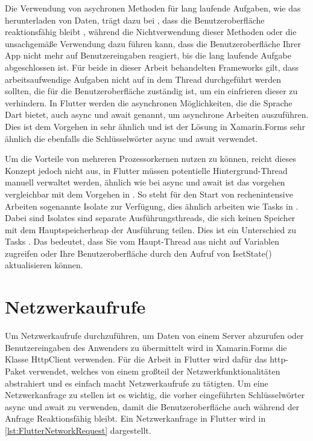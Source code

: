 Die Verwendung von asychronen Methoden für lang laufende Aufgaben, wie das herunterladen von Daten, trägt dazu bei , dass die Benutzeroberfläche reaktionsfähig bleibt , während die Nichtverwendung dieser Methoden oder die unsachgemäße Verwendung dazu führen kann,  dass die Benutzeroberfläche Ihrer App nicht mehr auf Benutzereingaben reagiert, bis die lang laufende Aufgabe abgeschlossen ist.  Für beide in dieser Arbeit behandelten Frameworks gilt,  dass arbeitsaufwendige Aufgaben nicht auf in dem Thread durchgeführt werden sollten,  die für die Benutzeroberfläche zuständig ist, um ein einfrieren dieser zu verhindern. 
In Flutter werden die asynchronen Möglichkeiten, die die Sprache Dart bietet, auch \glq async\grq{} und \glq await\grq{}  genannt, um asynchrone Arbeiten auszuführen. Dies ist dem Vorgehen in \Csharp sehr ähnlich und ist der Lösung in Xamarin.Forms sehr ähnlich die ebenfalls die Schlüsselwörter  \glq async\grq{} und \glq await\grq{}  verwendet. 

Um die Vorteile von mehreren Prozessorkernen nutzen zu können,  reicht dieses Konzept jedoch nicht aus,  in Flutter müssen potentielle Hintergrund-Thread manuell verwaltet werden,  ähnlich wie bei \glq async\grq{} und \glq await\grq{}  ist das vorgehen vergleichbar mit dem Vorgehen in \Csharp. So steht für den Start von rechenintensive Arbeiten sogenannte \glq Isolate\grq{} zur Verfügung,   dies ähnlich arbeiten wie Tasks in \Csharp. Dabei sind \glq Isolates \grq{}  sind separate Ausführungsthreads, die sich keinen Speicher mit dem Hauptspeicherheap der Ausführung teilen.  Dies ist ein Unterschied zu \glq Tasks\grq{} .  Das bedeutet, dass Sie vom Haupt-Thread aus nicht auf Variablen zugreifen oder Ihre Benutzeroberfläche durch den Aufruf von \glq IsetState()\grq{}  aktualisieren können.

\section{Netzwerkaufrufe}
Um Netzwerkaufrufe durchzuführen, um Daten von einem Server abzurufen oder Benutzereingaben des Anwenders zu übermittelt wird in Xamarin.Forms die Klasse HttpClient verwenden. Für die Arbeit in Flutter wird dafür das http-Paket verwendet, welches von einem großteil der Netzwerkfunktionalitäten abstrahiert und es einfach macht Netzwerkaufrufe zu tätigten.  Um eine Netzwerkanfrage zu stellen ist es wichtig, die vorher eingeführten Schlüsselwörter \glq async\grq{} und \glq await\grq{} zu verwenden, damit die Benutzeroberfläche auch während der Anfrage Reaktionsfähig bleibt.  Ein Netzwerkanfrage in Flutter wird in  \ref{lst:FlutterNetworkRequest} dargestellt.


